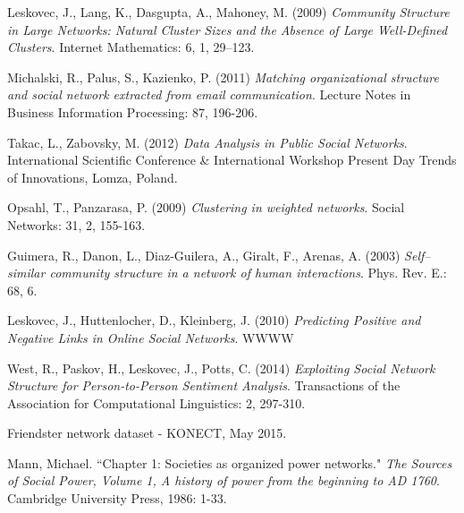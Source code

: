 \documentclass[3p,times]{elsarticle}
\begin{document}
\begin{thebibliography}{9}
	Leskovec, J., Lang, K., Dasgupta, A., Mahoney, M. (2009)
	\textit{Community Structure in Large Networks: Natural Cluster Sizes and the Absence of Large Well-Defined Clusters}.
	Internet Mathematics: 6, 1, 29--123.
	
	Michalski, R., Palus, S., Kazienko, P. (2011)
	\textit{Matching organizational structure and social network extracted from email communication}.
	Lecture Notes in Business Information Processing: 87, 196-206.
	
	Takac, L., Zabovsky, M. (2012)
	\textit{Data Analysis in Public Social Networks}.
	International Scientific Conference \& International Workshop Present Day Trends of Innovations, Lomza, Poland.
	
	Opsahl, T., Panzarasa, P. (2009)
	\textit{Clustering in weighted networks}.
	Social Networks: 31, 2, 155-163.
	
	Guimera, R., Danon, L., Diaz-Guilera, A., Giralt, F., Arenas, A. (2003)
	\textit{Self--similar community structure in a network of human interactions}.
	Phys. Rev. E.: 68, 6.
	
	Leskovec, J., Huttenlocher, D., Kleinberg, J. (2010)
	\textit{Predicting Positive and Negative Links in Online Social Networks}.
	WWWW
	
	West, R., Paskov, H., Leskovec, J., Potts, C. (2014)
	\textit{Exploiting Social Network Structure for Person-to-Person Sentiment Analysis}.
	Transactions of the Association for Computational Linguistics: 2, 297-310.

    Friendster network dataset - KONECT, May 2015.
    
    Mann, Michael. ``Chapter 1: Societies as organized power networks."
    \textit{The Sources of Social Power, Volume 1, A history of power from the beginning to AD 1760}. Cambridge University Press, 1986: 1-33.
    
\end{thebibliography}


\end{document}
